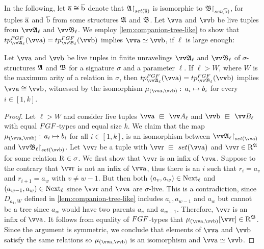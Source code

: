 In the following, let $\overline{\mathrm{a}} \cong \overline{\mathrm{b}}$ denote that $\restr{\str{A}}{\set(\elemtuplea)}$ is isomorphic to $\restr{\str{B}}{\set(\elemtupleb)}$, for tuples $\overline{\mathrm{a}}$ and $\overline{\mathrm{b}}$ from some structures ${\mathfrak{A}}$ and ${\mathfrak{B}}$.
Let $\elemtuptuplea$ and $\elemtuptupleb$ be live tuples from $\unravel{A}_{\ell}$ and $\unravel{B}_{\ell}$.
We employ \cref{lem:companion-tree-like} to show that $\tp{\FGF}{\unravel{A}_{\ell}}{\elemtuptuplea} = \tp{\FGF}{\unravel{B}_{\ell}}{\elemtuptupleb}$ implies $\elemtuptuplea \simeq \elemtuptupleb$, if $\ell$ is large enough:
\begin{lemma}\label{lem:fgf-type-iso}
  Let $\elemtuptuplea$ and $\elemtuptupleb$ be live tuples in finite unravelings $\unravel{A}_{\ell}$ and $\unravel{B}_{\ell}$ of $\sigma$-structures ${\mathfrak{A}}$ and ${\mathfrak{B}}$ for a signature $\sigma$ and a parameter $\ell$.
  If $\ell > W$, where $W$ is the maximum arity of a relation in $\sigma$, then $\tp{\FGF}{\unravel{A}_{\ell}}{\elemtuptuplea} = \tp{\FGF}{\unravel{B}_{\ell}}{\elemtuptupleb}$ implies $\elemtuptuplea \isoeq \elemtuptupleb$, witnessed by the isomorphism $\mu_{(\elemtuptuplea, \elemtuptupleb)}:\, a_{i} \mapsto b_{i}$ for every $i \in [1, k]$.
\end{lemma}
\begin{proof}
Let $\ell > W$ and consider live tuples $\elemtuptuplea \sqin \unraveldom{A}_{\ell}$ and $\elemtuptupleb \sqin \unraveldom{B}_{\ell}$ with equal $\FGF$-types and equal size $k$.
We claim that the map $\mu_{(\elemtuptuplea, \elemtuptupleb)}:\, a_{i} \mapsto b_{i}$ for all $i \in [1, k]$, is an isomorphism between $\restr{\str{\unravel{A}_{\ell}}}{\set(\elemtuptuplea)}$ and $\restr{\str{\unravel{B}_{\ell}}}{\set(\elemtuptupleb)}$.
Let $\elemtuptupler$ be a tuple with $\elemtuptupler \sqin \set(\elemtuptuplea)$ and $\elemtuptupler \in \relR^{\str{A}}$ for some relation $\mathrm{R} \in \sigma$.
We first show that $\elemtuptupler$ is an infix of $\elemtuptuplea$.
Suppose to the contrary that $\elemtuptupler$ is not an infix of $\elemtuptuplea$, thus there is an $i$ such that $r_{i} = a_{v}$ and $r_{i+1} = a_{w}$ with $v \ne w - 1$.
But then both $(a_{v}, a_{w}) \in \mathrm{Next}_{\ell}$ and $(a_{w-1}, a_{w}) \in \mathrm{Next}_{\ell}$ since $\elemtuptupler$ and $\elemtuptuplea$ are $\sigma$-live.
This is a contradiction, since $D_{a_{1}, W}$ defined in \cref{lem:companion-tree-like} includes $a_{v}, a_{w-1}$ and $a_{w}$ but cannot be a tree since $a_{w}$ would have two parents $a_{v}$ and $a_{w-1}$.
Therefore, $\elemtuptupler$ is an infix of $\elemtuptuplea$.
It follows from equality of $\FGF$-types that $\mu_{(\elemtuptuplea, \elemtuptupleb)}[\elemtuptupler] \in \relR^{\str{B}}$.
Since the argument is symmetric, we conclude that elements of $\elemtuptuplea$ and $\elemtuptupleb$ satisfy the same relations so $\mu_{(\elemtuptuplea, \elemtuptupleb)}$ is an isomorphism and $\elemtuptuplea \simeq \elemtuptupleb$.
\end{proof}

